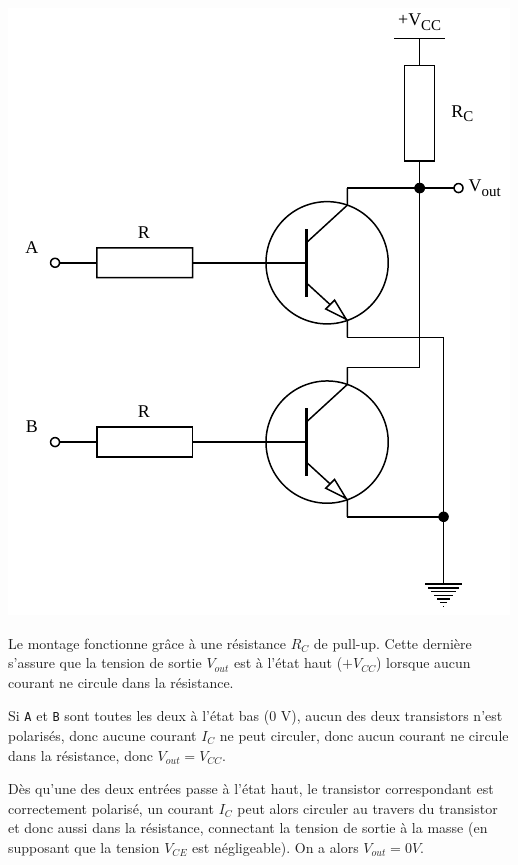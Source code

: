 \documentclass{../../template/tp}
\begin{document}
{
    \begin{center}
        \includegraphics[]{NOR.pdf}
    \end{center}
    Le montage fonctionne grâce à une résistance $R_C$ de pull-up. Cette dernière s'assure que la tension de sortie $V_{out}$ est à l'état haut ($+ V_{CC}$) lorsque aucun courant ne circule dans la résistance.

    Si \texttt{A} et \texttt{B} sont toutes les deux à l'état bas (0 V), aucun des deux transistors n'est polarisés, donc aucune courant $I_C$ ne peut circuler, donc aucun courant ne circule dans la résistance, donc $V_{out} = V_{CC}$.

    Dès qu'une des deux entrées passe à l'état haut, le transistor correspondant est correctement polarisé, un courant $I_C$ peut alors circuler au travers du transistor et donc aussi dans la résistance, connectant la tension de sortie à la masse (en supposant que la tension $V_{CE}$ est négligeable). On a alors $V_{out} = 0 V$.
}
\end{document}
